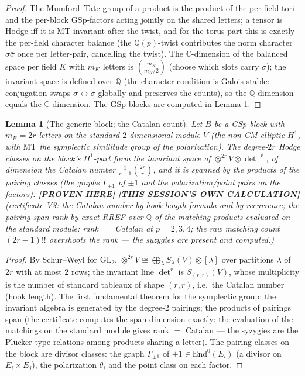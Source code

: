 \documentclass[11pt]{article}
\newtheorem{lemma}[theorem]{Lemma}
\newcommand{\PROVEN}{\textbf{[PROVEN HERE]}}
\newcommand{\MINE}{\textbf{[THIS SESSION'S OWN CALCULATION]}}
\newcommand{\Q}{\mathbb{Q}}
\newcommand{\C}{\mathbb{C}}
\newcommand{\End}{\mathrm{End}}
\newcommand{\MT}{\mathrm{MT}}
\newcommand{\GSp}{\mathrm{GSp}}
\begin{document}
\begin{proof}
The Mumford--Tate group of a product is the product of the per-field
tori and the per-block $\GSp$-factors acting jointly on the shared
letters; a tensor is Hodge iff it is $\MT$-invariant after the twist,
and for the torus part this is exactly the per-field character balance
(the $\Q(p)$-twist contributes the norm character
$\sigma\bar\sigma$ once per letter-pair, cancelling the twist). The
$\C$-dimension of the balanced space per field $K$ with $m_K$ letters is
$\binom{m_K}{m_K/2}$ (choose which slots carry $\sigma$); the invariant
space is defined over $\Q$ (the character condition is
Galois-stable: conjugation swaps $\sigma\leftrightarrow\bar\sigma$
globally and preserves the counts), so the $\Q$-dimension equals the
$\C$-dimension. The $\GSp$-blocks are computed in Lemma \ref{lem:generic}.
\end{proof}

\begin{lemma}[The generic block; the Catalan count]\label{lem:generic}
Let $B$ be a GSp-block with $m_B=2r$ letters on the standard $2$-dimensional
module $V$ (the non-CM elliptic $H^1$, with $\MT$ the symplectic
similitude group of the polarization). The degree-$2r$ Hodge classes on
the block's $H^1$-part form the invariant space of
$\otimes^{2r}V\otimes\det^{-r}$, of dimension the Catalan number
$\frac{1}{r+1}\binom{2r}{r}$, and it is spanned by the products of the
pairing classes (the graphs $\Gamma_{\pm 1}$ of $\pm1$ and the
polarization/point pairs on the factors).
\PROVEN{} \MINE{} (certificate V3: the Catalan number by hook-length
formula and by recurrence; the pairing-span rank by exact RREF over $\Q$
of the matching products evaluated on the standard module:
rank $=$ Catalan at $p=2,3,4$; the raw matching count $(2r-1)!!$
overshoots the rank --- the syzygies are present and computed.)
\end{lemma}

\begin{proof}
By Schur--Weyl for $\mathrm{GL}_2$,
$\otimes^{2r}V\cong\bigoplus_\lambda S_\lambda(V)\otimes[\lambda]$ over
partitions $\lambda$ of $2r$ with at most $2$ rows; the invariant line
$\det^{r}$ is $S_{(r,r)}(V)$, whose multiplicity is the number of
standard tableaux of shape $(r,r)$, i.e.\ the Catalan number (hook
length). The first fundamental theorem for the symplectic group: the
invariant algebra is generated by the degree-$2$ pairings; the products
of pairings span (the certificate computes the span dimension exactly:
the evaluation of the matchings on the standard module gives rank
$=$ Catalan --- the syzygies are the Pl\"ucker-type relations among
products sharing a letter). The pairing classes on the block are
divisor classes: the graph $\Gamma_{\pm1}$ of $\pm1\in\End^0(E_i)$
(a divisor on $E_i\times E_j$), the polarization $\theta_i$ and the
point class on each factor.
\end{proof}
\end{document}
